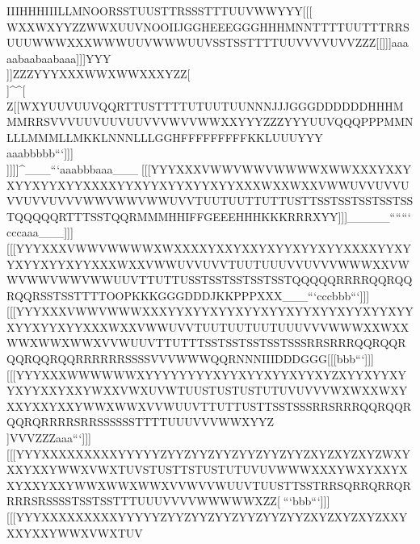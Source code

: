 IIIHHHIIILLMNOORSSTUUSTTRSSSTTTUUVWWYYY[[[\\\ZZZ[[\[[[VVVSSSQQQRRRUUUVVVVVVVWWXXXVVWSSTPPPNNNNNOOOPOOPPPQOOPHHHFFFMMMQQQSSTTTUWWX\\\___aabbbcbbcbbc```[[[VVVZZZYYZYYYXXYYYYYYZZZ[[\\\]]WXXWXYYZZWWXUUVNOOIIJGGHEEEGGGHHHMNNTTTTUUTTTRRSUUUWWWXXXWWWUUVWWWUUVSSTSSTTTTUUVVVVUVVZZZ[[\TTUPPPNNNLLMMMNOOOOOOOOPNNNHHHJJJOOPSSSSSTUUVYYY]]]aaaaabaabaabaaa]]]YYY\\\ZZZYYYXXXXXXXXYYYZ[[\\\]Z[\YZ[Z[[YYZVWWTUUTTUTUUTUUOPPJJJEFFBBBEFFJJKNNOSSTUUUUUVUUVTTUUUUUUVUUVUUVUUUVVWXXXWXXZZ[YYYTTUMMMLLMLLLLLLKKLLLMMMNMMMJJJEEEFFFJJJPPQUUUYYY[[[^^___`aabaabbbb___[[[]]]ZZZYYYXXXWWXWWXXXYZZ[\\]\]^\]^[\\Z[[WXYUUVUUVQQRTTUSTTTTUTUUTUUNNNJJJGGGDDDDDDHHHMMMRRSVVVUUVUUVUUVVVWVVWWXXYYYZZZYYYUUVQQQPPPMMNLLLMMMLLMKKLNNNLLLGGHFFFFFFFFFKKLUUUYYY\\\]^^`aaabbbbb```]]]\\\YYZXXXWWWWWWVVWWWXYYZZZ[Z[\[[\Z[[XYZWXYWXXVWWVVWUUVTUUTTUTTUTTUTTUSSSTTTSTTRRRKKLIIIGGGFFFHHHMMNRSSWWWVVWVWWXXYZZZZZZWWXTTUSSSSSSQQQPPPNNOMMNOOOMMMNNNKKLNNNIIIGGGGGGLLLWXX^___``abbbbbaaa___\\\XXYWWXWWWVVVVVWVVWXXYYYZYYZYYZXYZWYYWXYWXXWXXVXXWWXVWWUVVUVVTTUTTUSTTSTTSSTSSTSSTTUUSSTRRRNNOLLLIIJGHHJJJMMNSSSWWXXXYVVWVVVUUVUUUTTTTTTSSTQQRQQQQQQPPPNNONNNQRRQRRMMNIIJIIIKKKWXXabbbbb```^^^\\\XXYWWWVVVVVVVVWVVWWWXXXYXYZXYZXYYXYYWXYXYYXYYXYYWXXWXXWXXWWXUVVUVVTUUSTTSTTSTTSSTSTTRSSSSTTTUVVVWWXTTUPPPIJJIJJHHHJJJMMNRRRVVVUUUUUUVVVUUUUUUUUUTTTTTTRRRQQQTTTUUUVVVXXYVWWLMMQQQ^__aaa```^^^\\\XXXWWWVVVVVVVVWWWXWWXXXYWXYXYYWYYWYYWXXXXXWYYXYYWYYWYYVXXVXXVWWVWWUVVUUVTTUTTUTUUTUUTUUSTTSTTTUUUUVUUVUUVUVVWWWRRRNNNIIJGGGGGGJJKOOOSSSUUVUUUUUUUUUVVVTTTSSTWWWXXXZZZ[[[\\\___```bbbaaa```^^^[[[YYYWXXVVVVVVVVWWWXWWXXXYXXYXYYXYYXYYWXXXYYXYYXYYXYYXYYXYYXYYWXXUVVUVVTUUTUUTUUUVVVWWVWWTUUTUUTTUTTUTUUUUVTUUTTUSTTTTTUUUUUVQQQLLMIIIEEEFFGIIILLMOOOUUUVVVTTTXXXYYY]]]]]^___```aaabbbaaa___^^^[[[YYYXXXVWWVWWVWWWWXWWXXXYXXYXYYXYYXYYXXXXYYXYYXYYXYYXYYXXXWXXWXXVWWUVVUVVUVVUVVUVVVWWVWWVWWUVVTUUTUUTTUTTUSTTSSTSSTSSTSSTSSTQQQQQRTTTSSTQQRMMMHHIFFGEEEHHHKKKRRRXYY]]]_____```````cccaaa___]]][[[YYYXXXVWWVWWWWXWXXXXYXXYXXYXYYXYYXYYXXXXYYXYYXYYXYYXYYXXXWXXVWWUVVUVVTUUTUUUVVUVVVWWWXXVWWVWWVWWVWWUUVTTUTTUSSTSSTSSTSSTSSTQQQQQRRRRQQRQQRQQRSSTSSTTTTOOPKKKGGGDDDJKKPPPXXX___```cccbbb```]]][[[YYYXXXVWWVWWWXXXYYXYYXYYXYYXYYXYYXYYXYYXYYXYYXYYXYYXYYXXXWXXVWWUVVTUUTUUTUUTUUUVVVWWWXXWXXWWXWWXWWXVVWUUVTTUTTTSSTSSTSSTSSTSSSRRSRRRQQRQQRQQRQQRQQRRRRRRSSSSVVVWWWQQRNNNIIIDDDGGG[[[bbb```]]][[[YYYXXXWWWWWWXYYYYYYYYXYYXYYXYYXYYXYZXYYXYYXYYXYYXXYXXYWXXVWXUVWTUUSTUSTUSTUTUVUVVVWXWXXWXYXXYXXYXXYWWXWWXVVWUUVTTUTTUSTTSSTSSSRRSRRRQQRQQRQQRQRRRRSRRSSSSSSTTTTUUUVVVWWXYYZ\\]VVVZZZaaa```]]][[[YYYXXXXXXXXXYYYYYZYYZYYZYYZYYZYYZYYZXYZXYZXYZWXYXXYXXYWWXVWXTUVSTUSTTSTUSTUTUVUVWWWXXXYWXYXXYXXYXXYXXYWWXWWXWWXVVWVVWUUVTUUSTTSSTRRSQRRQRRQRRRRSRSSSSTSSTSSTTTUUUVVVVWWWWWXZZ[^^_```bbb```]]][[[YYYXXXXXXXXXYYYYYZYYZYYZYYZYYZYYZYYZXYZXYZXYZXXYXXYXXYWWXVWXTUV